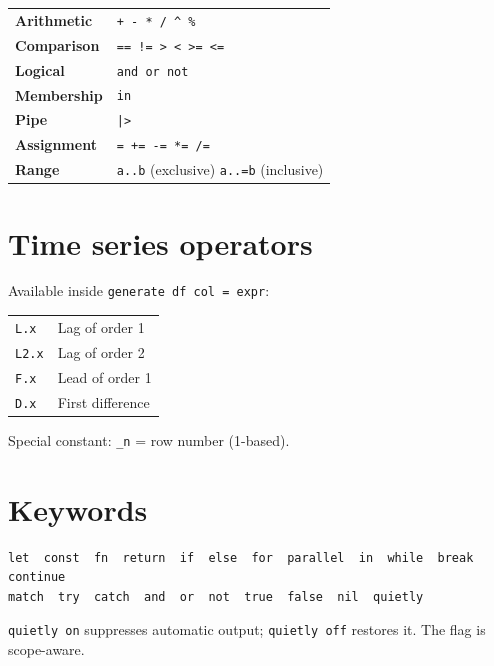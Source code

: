 \begin{center}
\begin{tabular}{ll}
\toprule
\textbf{Arithmetic}  & \texttt{+  -  *  /  \^{}  \%} \\
\textbf{Comparison}  & \texttt{== != > < >= <=} \\
\textbf{Logical}     & \texttt{and  or  not} \\
\textbf{Membership}  & \texttt{in} \\
\textbf{Pipe}        & \texttt{|>} \\
\textbf{Assignment}  & \texttt{=  +=  -=  *=  /=} \\
\textbf{Range}       & \texttt{a..b} (exclusive) \quad \texttt{a..=b} (inclusive) \\
\bottomrule
\end{tabular}
\end{center}

\section{Time series operators}

Available inside \lstinline{generate df col = expr}:

\begin{center}
\begin{tabular}{ll}
\toprule
\texttt{L.x}   & Lag of order 1 \\
\texttt{L2.x}  & Lag of order 2 \\
\texttt{F.x}   & Lead of order 1 \\
\texttt{D.x}   & First difference \\
\bottomrule
\end{tabular}
\end{center}

Special constant: \texttt{\_n} = row number (1-based).

\section{Keywords}

\begin{lstlisting}[style=inline, basicstyle=\ttfamily\footnotesize]
let  const  fn  return  if  else  for  parallel  in  while  break  continue
match  try  catch  and  or  not  true  false  nil  quietly
\end{lstlisting}

\lstinline{quietly on} suppresses automatic output; \lstinline{quietly off} restores it. The flag is scope-aware.

